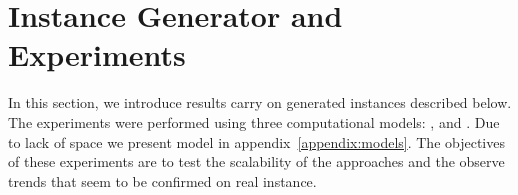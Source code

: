 \section{Instance Generator and Experiments}\label{sec:experiments}

In this section, we introduce results carry on generated instances described below. 
The experiments were performed using three computational models: \CP{}, \ASP{} and \MIP{}.
Due to lack of space we present model in appendix~\ref{appendix:models}.
The objectives of these experiments are to test the scalability of the approaches and the observe trends that seem to be confirmed on real instance.


% 



